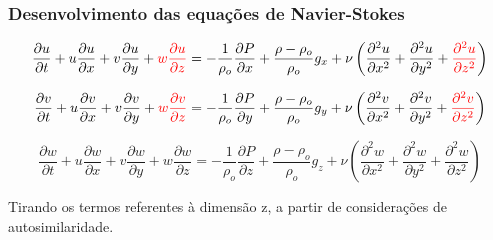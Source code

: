 \documentclass[xcolor=dvipsnames,10pt,aspectratio=169]{beamer}
\begin{document}
	\begin{frame}
		\frametitle{Desenvolvimento das equações de Navier-Stokes}
		\centering
		\begin{equation}
			\frac{\partial u}{\partial t} + u\frac{\partial u}{\partial x} + v\frac{\partial u}{\partial y} + {\color{red} w\frac{\partial u }{\partial z} } =  -\frac{1}{\rho_o} \frac{\partial P}{\partial x} + \frac{\rho - \rho_o}{\rho_o} g_x + \nu \left( \frac{\partial ^2 u}{\partial x^2} + \frac{\partial ^2 u}{\partial y^2} + { \color{red} \frac{\partial ^2 u}{\partial z^2} } \right)
		\end{equation}

		\begin{equation}
			\frac{\partial v}{\partial t} + u\frac{\partial v}{\partial x} + v\frac{\partial v}{\partial y} + {\color{red} w\frac{\partial v }{\partial z} } =  -\frac{1}{\rho_o} \frac{\partial P}{\partial y} + \frac{\rho - \rho_o}{\rho_o} g_y + \nu \left( \frac{\partial ^2 v}{\partial x^2} + \frac{\partial ^2 v}{\partial y^2} + { \color{red} \frac{\partial ^2 v}{\partial z^2} } \right)
		\end{equation}

		{\color{red}
			\begin{equation}
				\frac{\partial w}{\partial t} + u\frac{\partial w}{\partial x} + v\frac{\partial w}{\partial y} + w\frac{\partial w }{\partial z}  =  -\frac{1}{\rho_o} \frac{\partial P}{\partial z} + \frac{\rho - \rho_o}{\rho_o} g_z + \nu \left( \frac{\partial ^2 w}{\partial x^2} + \frac{\partial ^2 w}{\partial y^2} + \frac{\partial ^2 w}{\partial z^2} \right)
			\end{equation}
		}

		Tirando os termos referentes à dimensão z, a partir de considerações de autosimilaridade.


	\end{frame}
\end{document}
